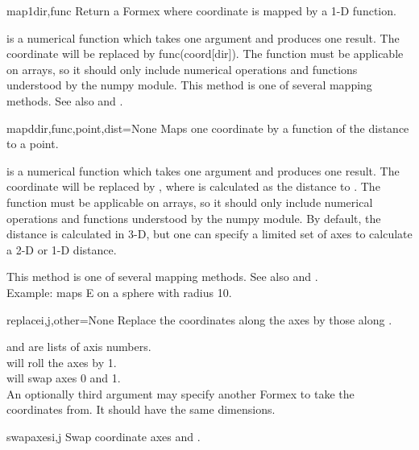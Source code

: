 {{\begin{methoddesc}  {map1}{dir,func}
Return a Formex where coordinate  is mapped by a 1-D function.

 is a numerical function which takes one argument and produces one result. The coordinate  will be replaced by func(coord[dir]). The function must be applicable on arrays, so it should only include numerical operations and functions understood by the numpy module. This method is one of several mapping methods. See also  and .
\end{methoddesc}

\begin{methoddesc}  {mapd}{dir,func,point,dist=None}
Maps one coordinate by a function of the distance to a point.

 is a numerical function which takes one argument and produces one result. The coordinate  will be replaced by , where  is calculated as the distance to . The function must be applicable on arrays, so it should only include numerical operations and functions understood by the numpy module. By default, the distance  is calculated in 3-D, but one can specify a limited set of axes to calculate a 2-D or 1-D distance.

This method is one of several mapping methods. See also  and .\\
Example:  maps E on a sphere with radius 10.
\end{methoddesc}

\begin{methoddesc}  {replace}{i,j,other=None}
Replace the coordinates along the axes  by those along .

 and  are lists of axis numbers.\\
 will roll the axes by 1.\\
 will swap axes 0 and 1.\\
An optionally third argument may specify another Formex to take the coordinates from. It should have the same dimensions.
\end{methoddesc}

\begin{methoddesc}  {swapaxes}{i,j}
Swap coordinate axes  and .
\end{methoddesc}

}}
